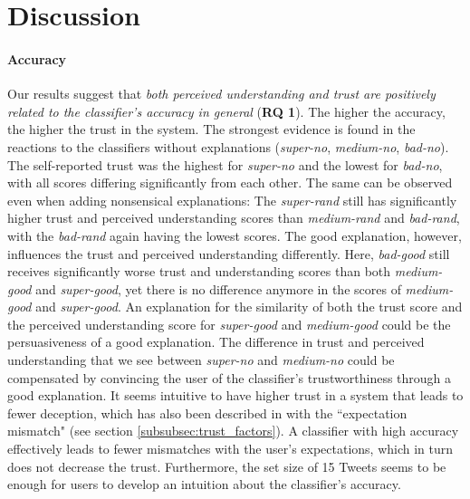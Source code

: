 \section{Discussion}
\paragraph{Accuracy} 
Our results suggest that \textit{both perceived understanding and trust are positively related to the classifier's accuracy in general} (\textbf{RQ 1}). The higher the accuracy, the higher the trust in the system. The strongest evidence is found in the reactions to the classifiers without explanations (\textit{super-no}, \textit{medium-no}, \textit{bad-no}). The self-reported trust was the highest for \textit{super-no} and the lowest for \textit{bad-no}, with all scores differing significantly from each other. The same can be observed even when adding nonsensical explanations: The \textit{super-rand} still has significantly higher trust and perceived understanding scores than \textit{medium-rand} and \textit{bad-rand}, with the \textit{bad-rand} again having the lowest scores. The good explanation, however, influences the trust and perceived understanding differently. Here, \textit{bad-good} still receives significantly worse trust and understanding scores than both \textit{medium-good} and \textit{super-good}, yet there is no difference anymore in the scores of \textit{medium-good} and \textit{super-good}. An explanation for the similarity of both the trust score and the perceived understanding score for \textit{super-good} and \textit{medium-good} could be the persuasiveness of a good explanation. The difference in trust and perceived understanding that we see between \textit{super-no} and \textit{medium-no} could be compensated by convincing the user of the classifier's trustworthiness through a good explanation.\newline
It seems intuitive to have higher trust in a system that leads to fewer deception, which has also been described in \cite{glass2008toward} with the ``expectation mismatch" (see section \ref{subsubsec:trust_factors}). A classifier with high accuracy effectively leads to fewer mismatches with the user's expectations, which in turn does not decrease the trust. Furthermore, the set size of 15 Tweets seems to be enough for users to develop an intuition about the classifier's accuracy.\newline
